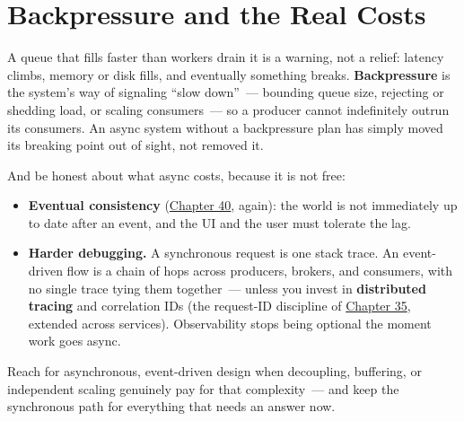 \setcounter{section}{6}
\section{Backpressure and the Real Costs}\label{41-event-driven-architecture:417-backpressure-and-the-real-costs}

A queue that fills faster than workers drain it is a warning, not a relief: latency climbs, memory or disk fills, and eventually something breaks. \textbf{Backpressure} is the system's way of signaling ``slow down''~--- bounding queue size, rejecting or shedding load, or scaling consumers~--- so a producer cannot indefinitely outrun its consumers. An async system without a backpressure plan has simply moved its breaking point out of sight, not removed it.

And be honest about what async costs, because it is not free:

\begin{itemize}
\tightlist
\item
  \textbf{Eventual consistency} (\hyperref[ch:40-distributed-systems]{Chapter 40}, again): the world is not immediately up to date after an event, and the UI and the user must tolerate the lag.
\item
  \textbf{Harder debugging.} A synchronous request is one stack trace. An event-driven flow is a chain of hops across producers, brokers, and consumers, with no single trace tying them together~--- unless you invest in \textbf{distributed tracing} and correlation IDs (the request-ID discipline of \hyperref[ch:35-observability]{Chapter 35}, extended across services). Observability stops being optional the moment work goes async.
\end{itemize}

\noindent{}Reach for asynchronous, event-driven design when decoupling, buffering, or independent scaling genuinely pay for that complexity~--- and keep the synchronous path for everything that needs an answer now.

